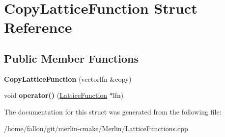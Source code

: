 \hypertarget{structCopyLatticeFunction}{}\section{Copy\+Lattice\+Function Struct Reference}
\label{structCopyLatticeFunction}
\subsection*{Public Member Functions}
\begin{DoxyCompactItemize}
\item 
\mbox{\label{structCopyLatticeFunction_ad5cdcc7c3870241cff21581bf92e69a0}} 
{\bfseries Copy\+Lattice\+Function} (vectorlfn \&copy)
\item 
\mbox{\label{structCopyLatticeFunction_a394aaff7aaf33ca3b41546781d46eb72}} 
void {\bfseries operator()} (\hyperlink{classLatticeFunction}{Lattice\+Function} $\ast$lfn)
\end{DoxyCompactItemize}


The documentation for this struct was generated from the following file\+:\begin{DoxyCompactItemize}
\item 
/home/fallon/git/merlin-\/cmake/\+Merlin/Lattice\+Functions.\+cpp\end{DoxyCompactItemize}
